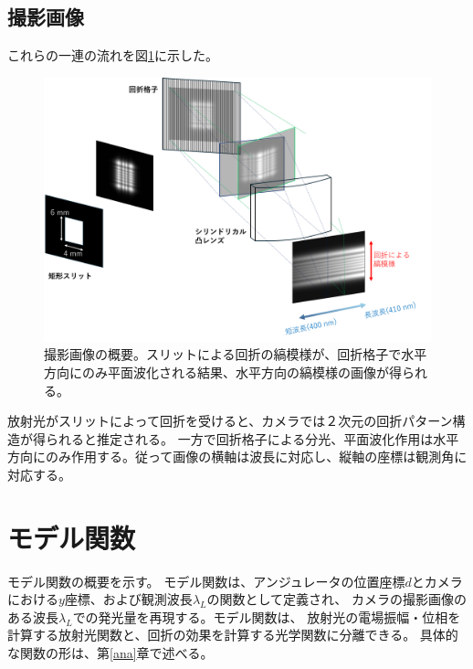 \documentclass[a4paper,11pt,uplatex]{jsbook}
\begin{document}
\subsection{撮影画像}
これらの一連の流れを図\ref{propagation}に示した。
\begin{figure}[H]
  \centering
  \includegraphics[width=\linewidth]{image/2-propagation.png}
  \caption[撮影画像の概要]{撮影画像の概要。スリットによる回折の縞模様が、回折格子で水平方向にのみ平面波化される結果、水平方向の縞模様の画像が得られる。}
  \label{propagation}
\end{figure}
放射光がスリットによって回折を受けると、カメラでは２次元の回折パターン構造が得られると推定される。
一方で回折格子による分光、平面波化作用は水平方向にのみ作用する。従って画像の横軸は波長に対応し、縦軸の座標は観測角に対応する。

\section{モデル関数}\label{sec:model fnc}
モデル関数の概要を示す。
モデル関数は、アンジュレータの位置座標$d$とカメラにおける$y$座標、および観測波長$\lambda_L$の関数として定義され、
カメラの撮影画像のある波長$\lambda_L$での発光量を再現する。モデル関数は、
放射光の電場振幅・位相を計算する放射光関数と、回折の効果を計算する光学関数に分離できる。
具体的な関数の形は、第\ref{ana}章で述べる。
\end{document}
